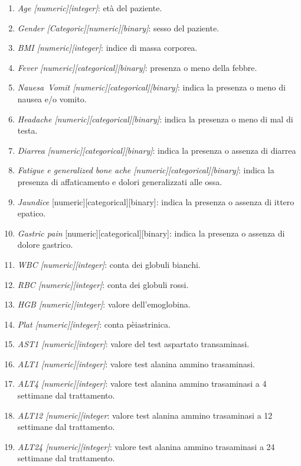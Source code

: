 \documentclass[italian,12pt,a4paper]{article}
\begin{document}
	\begin{enumerate}
		\item \textit{Age [numeric][integer]}: età del paziente.
		\item \textit{Gender [Categoric][numeric][binary]}: sesso del paziente.
		\item \textit{BMI [numeric][integer]}: indice di massa corporea.
		\item \textit{Fever [numeric][categorical][binary]}: presenza o meno della febbre.
		\item \textit{Nauesa\ Vomit [numeric][categorical][binary]}: indica la presenza o meno di nausea e/o vomito.
		\item \textit{Headache [numeric][categorical][binary]}: indica la presenza o meno di mal di testa.
		\item \textit{Diarrea [numeric][categorical][binary]}: indica  la presenza o assenza di diarrea
		\item \textit{Fatigue e generalized bone ache  [numeric][categorical][binary]}: indica la presenza di affaticamento e dolori generalizzati alle ossa.
		\item \textit{Jaundice} [numeric][categorical][binary]: indica la presenza o assenza di ittero epatico.
		\item \textit{Gastric pain} [numeric][categorical][binary]: indica la presenza o assenza di dolore gastrico.
        \item \textit{WBC [numeric][integer]}: conta dei globuli bianchi.
        \item \textit{RBC [numeric][integer]}: conta dei globuli rossi.
        \item \textit{HGB [numeric][integer]}: valore dell'emoglobina.
        \item \textit{Plat [numeric][integer]}: conta pèiastrinica.
        \item \textit{AST1 [numeric][integer]}: valore del test aspartato transaminasi.
        \item \textit{ALT1 [numeric][integer]}: valore test alanina ammino trasaminasi.
        \item \textit{ALT4 [numeric][integer]}: valore test alanina ammino trasaminasi a 4 settimane dal trattamento.
        \item \textit{ALT12 [numeric][integer}: valore test alanina ammino trasaminasi a 12 settimane dal trattamento.
        \item \textit{ALT24 [numeric][integer]}: valore test alanina ammino trasaminasi a 24 settimane dal trattamento.

\end{enumerate}
\end{document}
